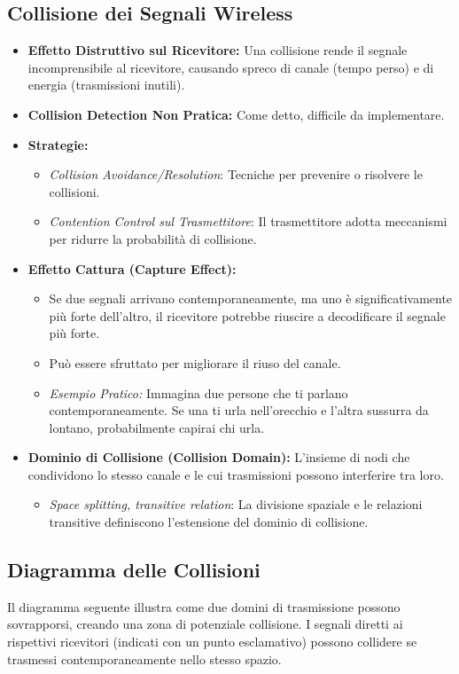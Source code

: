 \subsection{Collisione dei Segnali Wireless}
\begin{itemize}
    \item \textbf{Effetto Distruttivo sul Ricevitore:} Una collisione rende il segnale incomprensibile al ricevitore, causando spreco di canale (tempo perso) e di energia (trasmissioni inutili).
    \item \textbf{Collision Detection Non Pratica:} Come detto, difficile da implementare.
    \item \textbf{Strategie:}
    \begin{itemize}
        \item \textit{Collision Avoidance/Resolution}: Tecniche per prevenire o risolvere le collisioni.
        \item \textit{Contention Control sul Trasmettitore}: Il trasmettitore adotta meccanismi per ridurre la probabilità di collisione.
    \end{itemize}
    \item \textbf{Effetto Cattura (Capture Effect):}
    \begin{itemize}
        \item Se due segnali arrivano contemporaneamente, ma uno è significativamente più forte dell'altro, il ricevitore potrebbe riuscire a decodificare il segnale più forte.
        \item Può essere sfruttato per migliorare il riuso del canale.
        \item \textit{Esempio Pratico:} Immagina due persone che ti parlano contemporaneamente. Se una ti urla nell'orecchio e l'altra sussurra da lontano, probabilmente capirai chi urla.
    \end{itemize}
    \item \textbf{Dominio di Collisione (Collision Domain):} L'insieme di nodi che condividono lo stesso canale e le cui trasmissioni possono interferire tra loro.
    \begin{itemize}
        \item \textit{Space splitting, transitive relation}: La divisione spaziale e le relazioni transitive definiscono l'estensione del dominio di collisione.
    \end{itemize}
\end{itemize}

\subsection{Diagramma delle Collisioni}
Il diagramma seguente illustra come due domini di trasmissione possono sovrapporsi, creando una zona di potenziale collisione. I segnali diretti ai rispettivi ricevitori (indicati con un punto esclamativo) possono collidere se trasmessi contemporaneamente nello stesso spazio.

